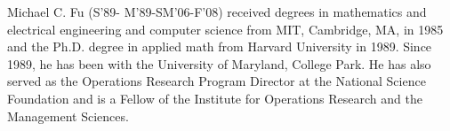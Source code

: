 \documentclass[journal]{IEEEtran}
\begin{document}


\begin{IEEEbiographynophoto}{Michael C. Fu}
(S'89- M'89-SM'06-F'08) received degrees in mathematics and electrical engineering and computer science from MIT, Cambridge, MA, in 1985 and the Ph.D. degree in applied math from Harvard University in 1989.
Since 1989, he has been with the University of Maryland, College Park. He has also served as the Operations Research Program Director at the National Science Foundation and is a Fellow of the Institute for Operations Research and the Management Sciences.
\end{IEEEbiographynophoto}








\end{document}
